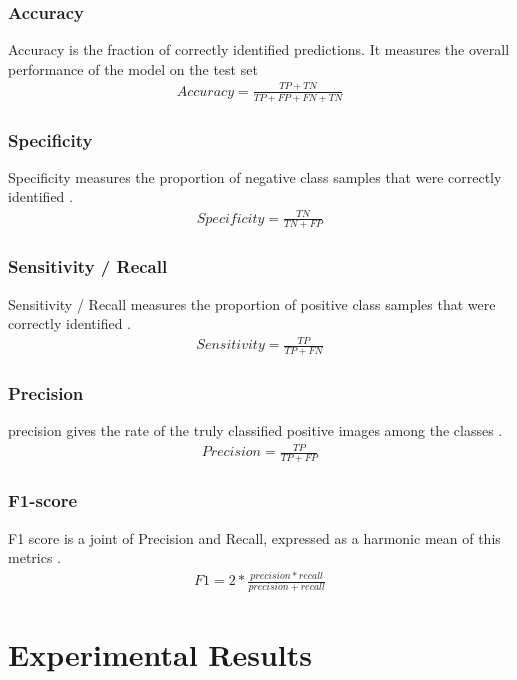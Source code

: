 \documentclass[12pt, letterpaper]{article}
\begin{document}
\subsubsection{Accuracy}
Accuracy is the fraction of correctly identified predictions. It measures the overall performance of the model on the test set \cite{Karthik_2021}
\begin{align}
Accuracy = \frac{TP + TN}{TP + FP + FN + TN}
\end{align}

\subsubsection{Specificity}
Specificity measures the proportion of negative class samples that were correctly identified \cite{Karthik_2021}.
\begin{align}
Specificity = \frac{TN}{TN + FP}
\end{align}

\subsubsection{Sensitivity / Recall}
Sensitivity / Recall measures the proportion of positive class samples that were correctly identified \cite{Karthik_2021}.
\begin{align}
    Sensitivity = \frac{TP}{TP + FN}
\end{align}

\subsubsection{Precision}
precision gives the rate of the truly classified positive images among the classes \cite{Karthik_2021}.
\begin{align}
    Precision = \frac{TP}{TP+FP}
\end{align}

\subsubsection{F1-score}
F1 score is a joint of Precision and Recall, expressed as a harmonic mean of this metrics \cite{Karthik_2021}.
\begin{align}
    F1 = 2*\frac{precision*recall}{precision+recall}
\end{align}

\newpage
\section{Experimental Results}
\end{document}
